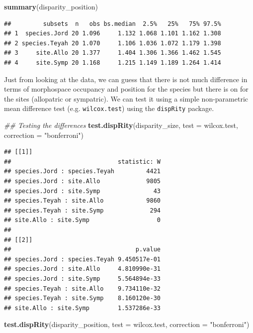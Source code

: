 \documentclass[]{book}
\newenvironment{Shaded}{\begin{snugshade}}{\end{snugshade}}
\newcommand{\CommentTok}[1]{\textcolor[rgb]{0.56,0.35,0.01}{\textit{#1}}}
\newcommand{\DataTypeTok}[1]{\textcolor[rgb]{0.13,0.29,0.53}{#1}}
\newcommand{\KeywordTok}[1]{\textcolor[rgb]{0.13,0.29,0.53}{\textbf{#1}}}
\newcommand{\NormalTok}[1]{#1}
\newcommand{\StringTok}[1]{\textcolor[rgb]{0.31,0.60,0.02}{#1}}
\begin{document}
\begin{Shaded}
\begin{Highlighting}[]
\KeywordTok{summary}\NormalTok{(disparity_position)}
\end{Highlighting}
\end{Shaded}

\begin{verbatim}
##         subsets  n   obs bs.median  2.5%   25%   75% 97.5%
## 1  species.Jord 20 1.096     1.132 1.068 1.101 1.162 1.308
## 2 species.Teyah 20 1.070     1.106 1.036 1.072 1.179 1.398
## 3     site.Allo 20 1.377     1.404 1.306 1.366 1.462 1.545
## 4     site.Symp 20 1.168     1.215 1.149 1.189 1.264 1.414
\end{verbatim}

Just from looking at the data, we can guess that there is not much difference in terms of morphospace occupancy and position for the species but there is on for the sites (allopatric or sympatric).
We can test it using a simple non-parametric mean difference test (e.g. \texttt{wilcox.test}) using the \texttt{dispRity} package.

\begin{Shaded}
\begin{Highlighting}[]
\CommentTok{## Testing the differences}
\KeywordTok{test.dispRity}\NormalTok{(disparity_size, }\DataTypeTok{test =}\NormalTok{ wilcox.test, }\DataTypeTok{correction =} \StringTok{"bonferroni"}\NormalTok{)}
\end{Highlighting}
\end{Shaded}

\begin{verbatim}
## [[1]]
##                              statistic: W
## species.Jord : species.Teyah         4421
## species.Jord : site.Allo             9805
## species.Jord : site.Symp               43
## species.Teyah : site.Allo            9860
## species.Teyah : site.Symp             294
## site.Allo : site.Symp                   0
## 
## [[2]]
##                                   p.value
## species.Jord : species.Teyah 9.450517e-01
## species.Jord : site.Allo     4.810990e-31
## species.Jord : site.Symp     5.564894e-33
## species.Teyah : site.Allo    9.734110e-32
## species.Teyah : site.Symp    8.160120e-30
## site.Allo : site.Symp        1.537286e-33
\end{verbatim}

\begin{Shaded}
\begin{Highlighting}[]
\KeywordTok{test.dispRity}\NormalTok{(disparity_position, }\DataTypeTok{test =}\NormalTok{ wilcox.test, }\DataTypeTok{correction =} \StringTok{"bonferroni"}\NormalTok{)}
\end{Highlighting}
\end{Shaded}
\end{document}
